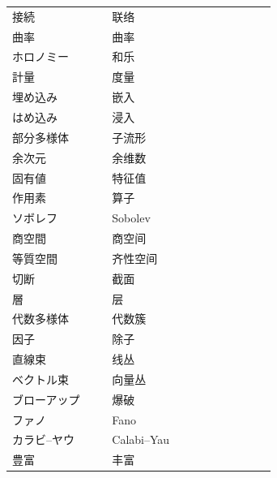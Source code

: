 {\begin{longtable}{p{0.31\linewidth} p{0.26\linewidth} p{0.25\linewidth}}
接続 & 联络 &  \\
曲率 & 曲率 &  \\
ホロノミー & 和乐 &  \\
計量 & 度量 &  \\
埋め込み & 嵌入 &  \\
はめ込み & 浸入 &  \\
部分多様体 & 子流形 &  \\
余次元 & 余维数 &  \\
固有値 & 特征值 &  \\
作用素 & 算子 &  \\
ソボレフ & Sobolev &  \\
商空間 & 商空间 &  \\
等質空間 & 齐性空间 &  \\
切断 & 截面 &  \\
層 & 层 &  \\
代数多様体 & 代数簇 &  \\
因子 & 除子 &  \\
直線束 & 线丛 &  \\
ベクトル束 & 向量丛 &  \\
ブローアップ & 爆破 &  \\
ファノ & Fano &  \\
カラビ–ヤウ & Calabi–Yau &  \\
豊富 & 丰富 &  \\
\bottomrule
\end{longtable}
}

